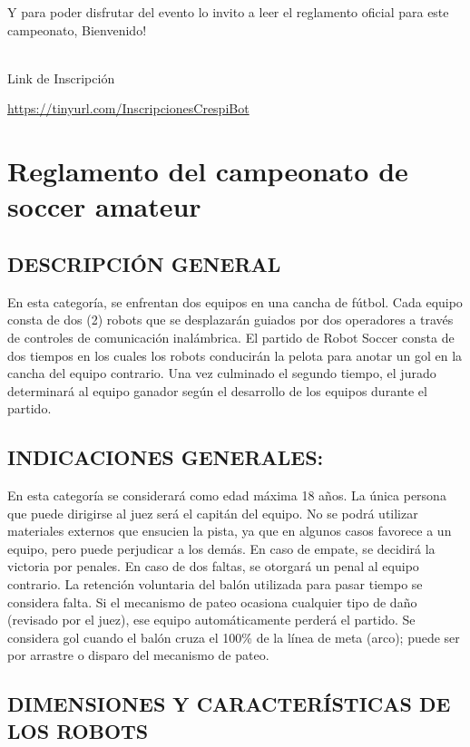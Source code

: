 \documentclass[
  letterpaper,
  DIV=11,
  numbers=noendperiod]{scrreprt}
\begin{document}
Y para poder disfrutar del evento lo invito a leer el reglamento oficial
para este campeonato, Bienvenido!\\
\strut \\
Link de Inscripción

\url{https://tinyurl.com/InscripcionesCrespiBot}


\chapter{Reglamento del campeonato de soccer
amateur}\label{reglamento-del-campeonato-de-soccer-amateur}

\section{DESCRIPCIÓN GENERAL}\label{descripciuxf3n-general}

En esta categoría, se enfrentan dos equipos en una cancha de fútbol.
Cada equipo consta de dos (2) robots que se desplazarán guiados por dos
operadores a través de controles de comunicación inalámbrica. El partido
de Robot Soccer consta de dos tiempos en los cuales los robots
conducirán la pelota para anotar un gol en la cancha del equipo
contrario. Una vez culminado el segundo tiempo, el jurado determinará al
equipo ganador según el desarrollo de los equipos durante el partido.

\section{INDICACIONES GENERALES:}\label{indicaciones-generales}

En esta categoría se considerará como edad máxima 18 años. La única
persona que puede dirigirse al juez será el capitán del equipo. No se
podrá utilizar materiales externos que ensucien la pista, ya que en
algunos casos favorece a un equipo, pero puede perjudicar a los demás.
En caso de empate, se decidirá la victoria por penales. En caso de dos
faltas, se otorgará un penal al equipo contrario. La retención
voluntaria del balón utilizada para pasar tiempo se considera falta. Si
el mecanismo de pateo ocasiona cualquier tipo de daño (revisado por el
juez), ese equipo automáticamente perderá el partido. Se considera gol
cuando el balón cruza el 100\% de la línea de meta (arco); puede ser por
arrastre o disparo del mecanismo de pateo.

\section{DIMENSIONES Y CARACTERÍSTICAS DE LOS
ROBOTS}\label{dimensiones-y-caracteruxedsticas-de-los-robots}
\end{document}
